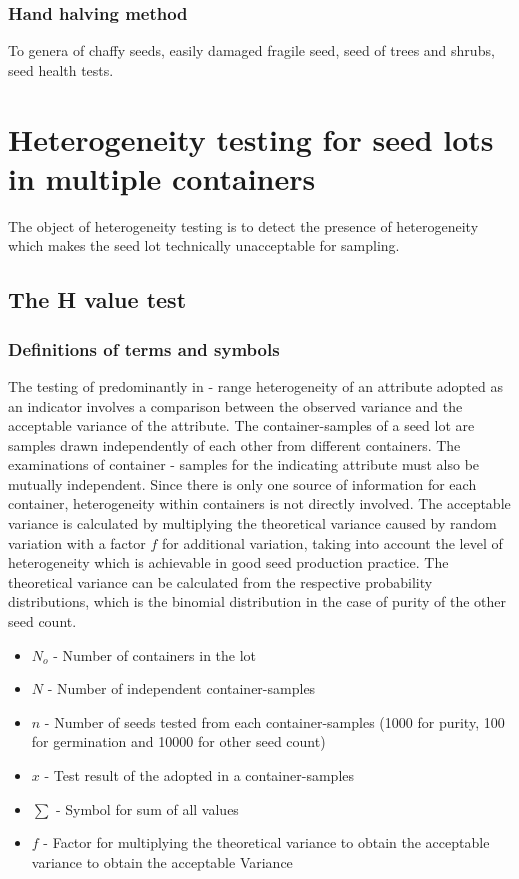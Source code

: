 \documentclass[]{book}
\providecommand{\tightlist}{%
  \setlength{\itemsep}{0pt}\setlength{\parskip}{0pt}}
\begin{document}
\subsubsection{Hand halving method}\label{hand-halving-method}

To genera of chaffy seeds, easily damaged fragile seed, seed of trees
and shrubs, seed health tests.

\section{Heterogeneity testing for seed lots in multiple
containers}\label{heterogeneity-testing-for-seed-lots-in-multiple-containers}

The object of heterogeneity testing is to detect the presence of
heterogeneity which makes the seed lot technically unacceptable for
sampling.

\subsection{The H value test}\label{the-h-value-test}

\subsubsection{Definitions of terms and
symbols}\label{definitions-of-terms-and-symbols}

The testing of predominantly in - range heterogeneity of an attribute
adopted as an indicator involves a comparison between the observed
variance and the acceptable variance of the attribute. The
container-samples of a seed lot are samples drawn independently of each
other from different containers. The examinations of container - samples
for the indicating attribute must also be mutually independent. Since
there is only one source of information for each container,
heterogeneity within containers is not directly involved. The acceptable
variance is calculated by multiplying the theoretical variance caused by
random variation with a factor \(f\) for additional variation, taking
into account the level of heterogeneity which is achievable in good seed
production practice. The theoretical variance can be calculated from the
respective probability distributions, which is the binomial distribution
in the case of purity of the other seed count.

\begin{itemize}
\tightlist
\item
  \(N_o\) - Number of containers in the lot
\item
  \(N\) - Number of independent container-samples
\item
  \(n\) - Number of seeds tested from each container-samples (1000 for
  purity, 100 for germination and 10000 for other seed count)
\item
  \(x\) - Test result of the adopted in a container-samples
\item
  \(\sum\) - Symbol for sum of all values
\item
  \(f\) - Factor for multiplying the theoretical variance to obtain the
  acceptable variance to obtain the acceptable Variance
\end{itemize}
\end{document}
